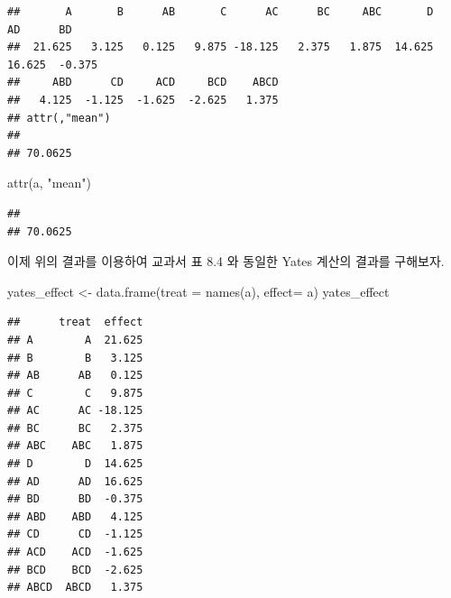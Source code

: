 \documentclass[
]{book}
\newenvironment{Shaded}{\begin{snugshade}}{\end{snugshade}}
\newcommand{\AttributeTok}[1]{\textcolor[rgb]{0.77,0.63,0.00}{#1}}
\newcommand{\FunctionTok}[1]{\textcolor[rgb]{0.00,0.00,0.00}{#1}}
\newcommand{\NormalTok}[1]{#1}
\newcommand{\OtherTok}[1]{\textcolor[rgb]{0.56,0.35,0.01}{#1}}
\newcommand{\SpecialCharTok}[1]{\textcolor[rgb]{0.00,0.00,0.00}{#1}}
\newcommand{\StringTok}[1]{\textcolor[rgb]{0.31,0.60,0.02}{#1}}
\begin{document}
\begin{Shaded}
\end{Shaded}

\begin{verbatim}
##       A       B      AB       C      AC      BC     ABC       D      AD      BD 
##  21.625   3.125   0.125   9.875 -18.125   2.375   1.875  14.625  16.625  -0.375 
##     ABD      CD     ACD     BCD    ABCD 
##   4.125  -1.125  -1.625  -2.625   1.375 
## attr(,"mean")
##         
## 70.0625
\end{verbatim}

\begin{Shaded}
\begin{Highlighting}[]
\FunctionTok{attr}\NormalTok{(a, }\StringTok{"mean"}\NormalTok{)}
\end{Highlighting}
\end{Shaded}

\begin{verbatim}
##         
## 70.0625
\end{verbatim}

이제 위의 결과를 이용하여 교과서 표 8.4 와 동일한 Yates 계산의 결과를 구해보자.

\begin{Shaded}
\begin{Highlighting}[]
\NormalTok{yates\_effect }\OtherTok{\textless{}{-}} \FunctionTok{data.frame}\NormalTok{(}\AttributeTok{treat =} \FunctionTok{names}\NormalTok{(a), }\AttributeTok{effect=}\NormalTok{ a)}
\NormalTok{yates\_effect}
\end{Highlighting}
\end{Shaded}

\begin{verbatim}
##      treat  effect
## A        A  21.625
## B        B   3.125
## AB      AB   0.125
## C        C   9.875
## AC      AC -18.125
## BC      BC   2.375
## ABC    ABC   1.875
## D        D  14.625
## AD      AD  16.625
## BD      BD  -0.375
## ABD    ABD   4.125
## CD      CD  -1.125
## ACD    ACD  -1.625
## BCD    BCD  -2.625
## ABCD  ABCD   1.375
\end{verbatim}
\end{document}
